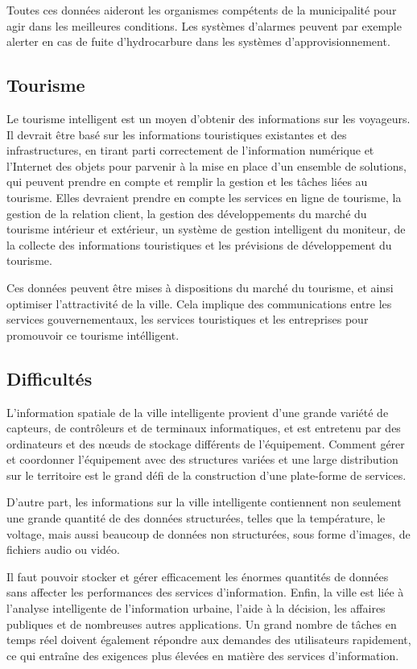 Toutes ces données aideront les organismes compétents de la municipalité pour agir dans les meilleures
conditions. Les systèmes d'alarmes peuvent par exemple alerter en cas de fuite d'hydrocarbure dans
les systèmes d'approvisionnement.

\subsection{Tourisme}

Le tourisme intelligent est un moyen d'obtenir des informations sur les voyageurs.
Il devrait être basé sur les informations touristiques existantes et des infrastructures,
en tirant parti correctement de l'information numérique et l'Internet des objets pour parvenir
à la mise en place d'un ensemble de solutions, qui peuvent prendre en compte et remplir
la gestion et les tâches liées au tourisme.
Elles devraient prendre en compte
les services en ligne de tourisme,
la gestion de la relation client,
la gestion des développements du marché du tourisme intérieur et extérieur,
un système de gestion intelligent du moniteur,
de la collecte des informations touristiques
et les prévisions de développement du tourisme.

Ces données peuvent être mises à dispositions du marché du tourisme, et ainsi optimiser l'attractivité de la ville.
Cela implique des communications entre les services gouvernementaux, les services touristiques et les entreprises
pour promouvoir ce tourisme intélligent.

\subsection{Difficultés}

L'information spatiale de la ville intelligente provient d'une grande variété de capteurs,
de contrôleurs et de terminaux informatiques, et est entretenu par des ordinateurs et des nœuds
de stockage différents de l'équipement.
Comment gérer et coordonner l'équipement avec des structures variées et une large distribution sur
le territoire est le grand défi de la construction d'une plate-forme de services.

D'autre part, les informations sur la ville intelligente contiennent non
seulement une grande quantité de des données structurées, telles que la température, le voltage,
mais aussi beaucoup de données non structurées, sous forme d'images, de fichiers audio ou vidéo.

Il faut pouvoir stocker et gérer efficacement les énormes quantités de données sans affecter
les performances des services d'information.
Enfin, la ville est liée à l'analyse intelligente de l'information urbaine, l'aide à la décision,
les affaires publiques et de nombreuses autres applications.
Un grand nombre de tâches en temps réel doivent également répondre aux demandes des utilisateurs rapidement,
ce qui entraîne des exigences plus élevées en matière des services d'information.

